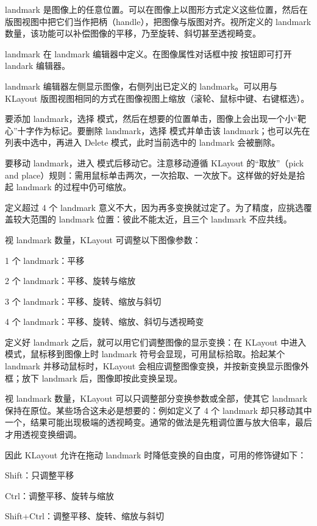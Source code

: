 landmark 是图像上的任意位置。可以在图像上以图形方式定义这些位置，然后在版图视图中把它们当作把柄（handle），把图像与版图对齐。视所定义的 landmark 数量，该功能可以补偿图像的平移，乃至旋转、斜切甚至透视畸变。

landmark 在 landmark 编辑器中定义。在图像属性对话框中按  按钮即可打开 landark 编辑器。

landmark 编辑器左侧显示图像，右侧列出已定义的 landmark。可以用与 KLayout 版图视图相同的方式在图像视图上缩放（滚轮、鼠标中键、右键框选）。

要添加 landmark，选择  模式，然后在想要的位置单击，图像上会出现一个小“靶心”十字作为标记。要删除 landmark，选择  模式并单击该 landmark；也可以先在列表中选中，再进入 Delete 模式，此时当前选中的 landmark 会被删除。

要移动 landmark，进入  模式后移动它。注意移动遵循 KLayout 的“取放”（pick and place）规则：需用鼠标单击两次，一次拾取、一次放下。这样做的好处是拾起 landmark 的过程中仍可缩放。

定义超过 4 个 landmark 意义不大，因为再多变换就过定了。为了精度，应挑选覆盖较大范围的 landmark 位置：彼此不能太近，且三个 landmark 不应共线。

视 landmark 数量，KLayout 可调整以下图像参数：

\begin{kldesc}
\item 1 个 landmark：平移
\item 2 个 landmark：平移、旋转与缩放
\item 3 个 landmark：平移、旋转、缩放与斜切
\item 4 个 landmark：平移、旋转、缩放、斜切与透视畸变
\end{kldesc}

定义好 landmark 之后，就可以用它们调整图像的显示变换：在 KLayout 中进入  模式，鼠标移到图像上时 landmark 符号会显现，可用鼠标拾取。拾起某个 landmark 并移动鼠标时，KLayout 会相应调整图像变换，并按新变换显示图像外框；放下 landmark 后，图像即按此变换呈现。

视 landmark 数量，KLayout 可以只调整部分变换参数或全部，使其它 landmark 保持在原位。某些场合这未必是想要的：例如定义了 4 个 landmark 却只移动其中一个，结果可能出现极端的透视畸变。通常的做法是先粗调位置与放大倍率，最后才用透视变换细调。

因此 KLayout 允许在拖动 landmark 时降低变换的自由度，可用的修饰键如下：

\begin{kldesc}
\item Shift：只调整平移
\item Ctrl：调整平移、旋转与缩放
\item Shift+Ctrl：调整平移、旋转、缩放与斜切
\end{kldesc}

